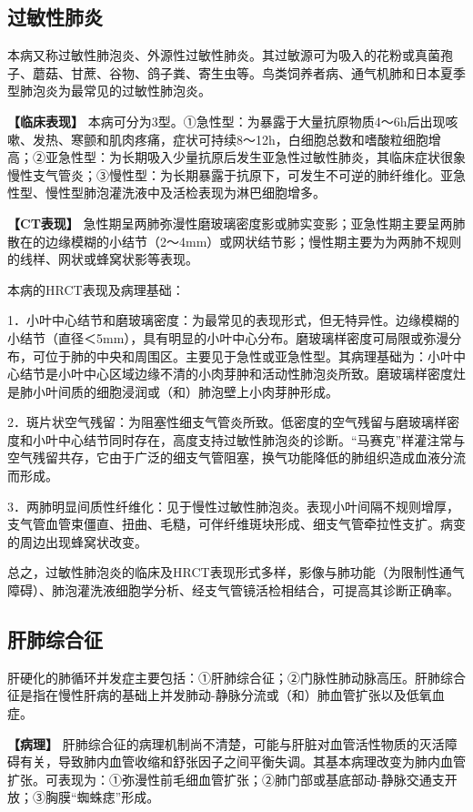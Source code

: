 \subsection{过敏性肺炎}

本病又称过敏性肺泡炎、外源性过敏性肺炎。其过敏源可为吸入的花粉或真菌孢子、蘑菇、甘蔗、谷物、鸽子粪、寄生虫等。鸟类饲养者病、通气机肺和日本夏季型肺泡炎为最常见的过敏性肺泡炎。

\textbf{【临床表现】}
本病可分为3型。①急性型：为暴露于大量抗原物质4～6h后出现咳嗽、发热、寒颤和肌肉疼痛，症状可持续8～12h，白细胞总数和嗜酸粒细胞增高；②亚急性型：为长期吸入少量抗原后发生亚急性过敏性肺炎，其临床症状很象慢性支气管炎；③慢性型：为长期暴露于抗原下，可发生不可逆的肺纤维化。亚急性型、慢性型肺泡灌洗液中及活检表现为淋巴细胞增多。

\textbf{【CT表现】}
急性期呈两肺弥漫性磨玻璃密度影或肺实变影；亚急性期主要呈两肺散在的边缘模糊的小结节（2～4mm）或网状结节影；慢性期主要为为两肺不规则的线样、网状或蜂窝状影等表现。

本病的HRCT表现及病理基础：

1．小叶中心结节和磨玻璃密度：为最常见的表现形式，但无特异性。边缘模糊的小结节（直径＜5mm），具有明显的小叶中心分布。磨玻璃样密度可局限或弥漫分布，可位于肺的中央和周围区。主要见于急性或亚急性型。其病理基础为：小叶中心结节是小叶中心区域边缘不清的小肉芽肿和活动性肺泡炎所致。磨玻璃样密度灶是肺小叶间质的细胞浸润或（和）肺泡壁上小肉芽肿形成。

2．斑片状空气残留：为阻塞性细支气管炎所致。低密度的空气残留与磨玻璃样密度和小叶中心结节同时存在，高度支持过敏性肺泡炎的诊断。“马赛克”样灌注常与空气残留共存，它由于广泛的细支气管阻塞，换气功能降低的肺组织造成血液分流而形成。

3．两肺明显间质性纤维化：见于慢性过敏性肺泡炎。表现小叶间隔不规则增厚，支气管血管束僵直、扭曲、毛糙，可伴纤维斑块形成、细支气管牵拉性支扩。病变的周边出现蜂窝状改变。

总之，过敏性肺泡炎的临床及HRCT表现形式多样，影像与肺功能（为限制性通气障碍）、肺泡灌洗液细胞学分析、经支气管镜活检相结合，可提高其诊断正确率。

\subsection{肝肺综合征}

肝硬化的肺循环并发症主要包括：①肝肺综合征；②门脉性肺动脉高压。肝肺综合征是指在慢性肝病的基础上并发肺动-静脉分流或（和）肺血管扩张以及低氧血症。

\textbf{【病理】}
肝肺综合征的病理机制尚不清楚，可能与肝脏对血管活性物质的灭活障碍有关，导致肺内血管收缩和舒张因子之间平衡失调。其基本病理改变为肺内血管扩张。可表现为：①弥漫性前毛细血管扩张；②肺门部或基底部动-静脉交通支开放；③胸膜“蜘蛛痣”形成。


